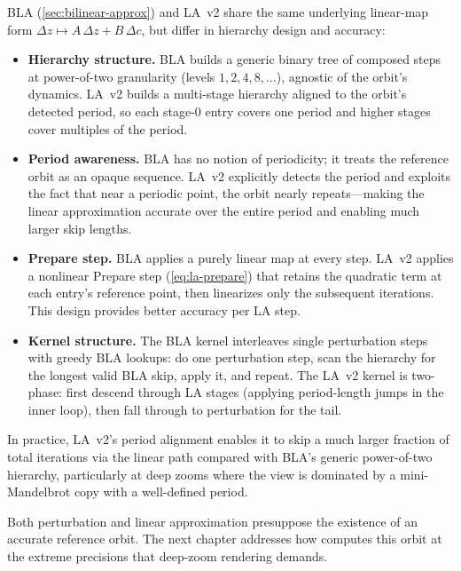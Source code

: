 BLA (\cref{sec:bilinear-approx}) and LA~v2 share the same underlying
linear-map form \(\Delta z \mapsto A\,\Delta z + B\,\Delta c\), but
differ in hierarchy design and accuracy:
\begin{itemize}
  \item \textbf{Hierarchy structure.}  BLA builds a generic binary tree
        of composed steps at power-of-two granularity (levels
        \(1, 2, 4, 8, \ldots\)), agnostic of the orbit's dynamics.
        LA~v2 builds a multi-stage hierarchy aligned to the orbit's
        detected period, so each stage-0 entry covers one period and
        higher stages cover multiples of the period.

  \item \textbf{Period awareness.}  BLA has no notion of periodicity;
        it treats the reference orbit as an opaque sequence.  LA~v2
        explicitly detects the period and exploits the fact that near a
        periodic point, the orbit nearly repeats---making the linear
        approximation accurate over the entire period and enabling much
        larger skip lengths.

  \item \textbf{Prepare step.}  BLA applies a purely linear map at every
        step.  LA~v2 applies a nonlinear Prepare step
        (\cref{eq:la-prepare}) that retains the quadratic term at each
        entry's reference point, then linearizes only the subsequent
        iterations.  This design provides better accuracy per LA step.

  \item \textbf{Kernel structure.}  The BLA kernel interleaves single
        perturbation steps with greedy BLA lookups: do one perturbation
        step, scan the hierarchy for the longest valid BLA skip, apply
        it, and repeat.  The LA~v2 kernel is two-phase: first descend
        through LA stages (applying period-length jumps in the inner
        loop), then fall through to perturbation for the tail.
\end{itemize}
In practice, LA~v2's period alignment enables it to skip a much larger
fraction of total iterations via the linear path compared with BLA's
generic power-of-two hierarchy, particularly at deep zooms where the
view is dominated by a mini-Mandelbrot copy with a well-defined period.

Both perturbation and linear approximation presuppose the existence of
an accurate reference orbit.  The next chapter addresses how
\FractalShark{} computes this orbit at the extreme precisions that
deep-zoom rendering demands.
